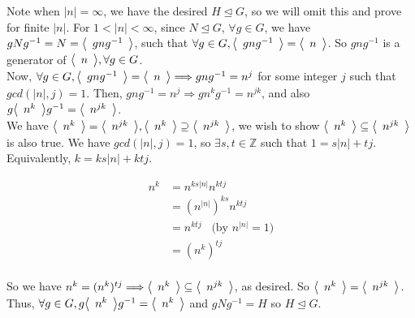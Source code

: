 \documentclass{article}
\begin{document}
    Note when $|n| = \infty$, we have the desired $H \trianglelefteq G$, so we will omit this and prove for finite $|n|$.  For $1 < |n| < \infty$, since $N \trianglelefteq G$, $\forall g \in G$, we have $gNg^{-1} = N = \cyc{gng^{-1}}$, such that $\forall g \in G, \cyc{gng^{-1}} = \cyc{n}$.  So $gng^{-1}$ is a generator of $\cyc{n}, \forall g \in G$. \\

    Now, $\forall g \in G, \cyc{gng^{-1}} = \cyc{n} \Longrightarrow gng^{-1} = n^j$ for some integer $j$ such that $gcd(|n|, j) = 1$.  Then, $gng^{-1} = n^j \Longrightarrow gn^kg^{-1} = n^{jk}$, and also $g\cyc{n^k}g^{-1} = \cyc{n^{jk}}$.  \\

    We have $\cyc{n^k} = \cyc{n^{jk}}, \cyc{n^k} \supseteq \cyc{n^{jk}}$, we wish to show $\cyc{n^k} \subseteq \cyc{n^{jk}}$ is also true.  We have $gcd(|n|, j) = 1$, so $\exists s,t \in \mathbb{Z}$ such that $1 = s|n| + tj$.  Equivalently, $k = ks|n| + ktj$.  

    \begin{align*}
      n^k &= n^{ks|n|}n^{ktj} \\
      &= (n^{|n|})^{ks}n^{ktj} \\
      &= n^{ktj} \;\;\;\text{(by $n^{|n|} = 1$)}\\
      &= (n^k)^{tj} \\
    \end{align*}

    So we have $n^k = (n^k)^{tj} \Longrightarrow \cyc{n^k} \subseteq \cyc{n^{jk}}$, as desired.  So $\cyc{n^k} = \cyc{n^{jk}}$. \\

    Thus, $\forall g \in G, g\cyc{n^k}g^{-1} = \cyc{n^k}$ and $gNg^{-1} = H$ so $H \trianglelefteq G$.

  
\end{document}
